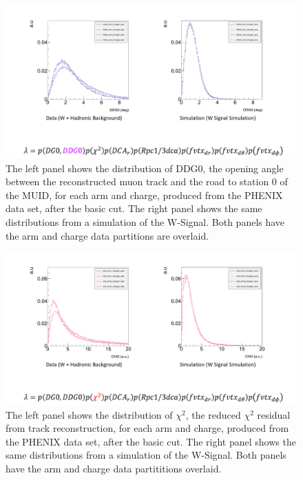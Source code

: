 \begin{figure}[h!]
  \centering
  \includegraphics[width=\linewidth,trim=4 70 4 4,clip]{./figures/pdf_DDG0.png}
  \caption{
    The left panel shows the distribution of DDG0, the opening angle between the
    reconstructed muon track and the road to station 0 of the MUID, for each arm
    and charge, produced from the PHENIX data set, after the basic cut. The
    right panel shows the same distributions from a simulation of the W-Signal.
    Both panels have the arm and charge data partitions are overlaid.
  }
  \label{fig:pdf_DDG0}
\end{figure}
\clearpage

\begin{figure}[h!]
  \centering
  \includegraphics[width=\linewidth,trim=4 70 4 4,clip]{./figures/pdf_chi2.png}
  \caption{
    The left panel shows the distribution of $\chi^2$, the reduced $\chi^2$
    residual from track reconstruction, for each arm and charge,
    produced from the PHENIX data set, after the basic cut. The right panel
    shows the same distributions from a simulation of the W-Signal. Both panels
    have the arm and charge data partititions overlaid.
  }
  \label{fig:pdf_chi2}
\end{figure}
\clearpage

